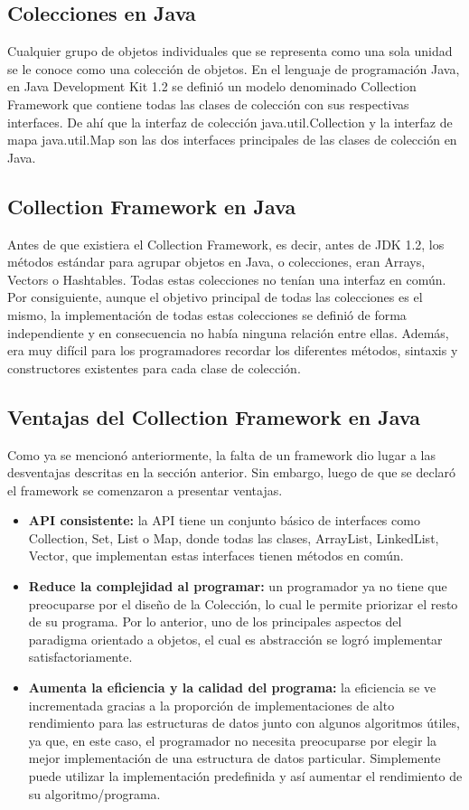 \documentclass{report}
\begin{document}
      \subsection*{Colecciones en Java}
      Cualquier grupo de objetos individuales que se representa como una sola unidad se le conoce como una colección de objetos. En el lenguaje de programación Java, en Java Development Kit 1.2 se definió un modelo denominado Collection Framework que contiene todas las clases de colección con sus respectivas interfaces. De ahí que la interfaz de colección java.util.Collection y la interfaz de mapa java.util.Map son las dos interfaces principales de las clases de colección en Java.
      \subsection*{Collection Framework en Java}
      Antes de que existiera el Collection Framework, es decir, antes de JDK 1.2, los métodos estándar para agrupar objetos en Java, o colecciones, eran Arrays, Vectors o Hashtables. Todas estas colecciones no tenían una interfaz en común. Por consiguiente, aunque el objetivo principal de todas las colecciones es el mismo, la implementación de todas estas colecciones se definió de forma independiente y en consecuencia no había ninguna relación entre ellas. Además, era muy difícil para los programadores recordar los diferentes métodos, sintaxis y constructores existentes para cada clase de colección.
      \subsection*{Ventajas del Collection Framework en Java}
      Como ya se mencionó anteriormente, la falta de un framework dio lugar a las desventajas descritas en la sección anterior. Sin embargo, luego de que se declaró el framework se comenzaron a presentar ventajas.
      \begin{itemize}
          \item \textbf{API consistente:} la API tiene un conjunto básico de interfaces como Collection, Set, List o Map, donde todas las clases, ArrayList, LinkedList, Vector, que implementan estas interfaces tienen métodos en común.
          \item \textbf{Reduce la complejidad al programar:} un programador ya no tiene que preocuparse por el diseño de la Colección, lo cual le permite priorizar el resto de su programa. Por lo anterior, uno de los principales aspectos del paradigma orientado a objetos, el cual es abstracción se logró implementar satisfactoriamente.
          \item \textbf{Aumenta la eficiencia y la calidad del programa:} la eficiencia se ve incrementada gracias a la proporción de implementaciones de alto rendimiento para las estructuras de datos junto con algunos algoritmos útiles, ya que, en este caso, el programador no necesita preocuparse por elegir la mejor implementación de una estructura de datos particular. Simplemente puede utilizar la implementación predefinida y así aumentar el rendimiento de su algoritmo/programa.
      \end{itemize}
      \newpage
\end{document}
